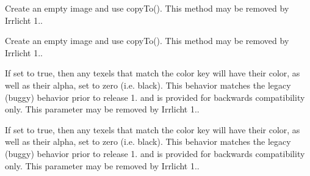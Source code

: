 \begin{DoxyRefList}
\item[\label{deprecated__deprecated000024}%
\Hypertarget{deprecated__deprecated000024}%
Member \hyperlink{classirr_1_1video_1_1IVideoDriver_aa06059abf33e473d7af77e1fbc2b0f75}{irr\+:\+:video\+:\+:I\+Video\+Driver\+:\+:create\+Image} (\hyperlink{classirr_1_1video_1_1IImage}{I\+Image} $\ast$image\+To\+Copy, const core\+::position2d$<$ s32 $>$ \&pos, const core\+::dimension2d$<$ u32 $>$ \&size)=0]Create an empty image and use copy\+To(). This method may be removed by Irrlicht 1..  
\item[\label{deprecated__deprecated000023}%
\Hypertarget{deprecated__deprecated000023}%
Member \hyperlink{classirr_1_1video_1_1IVideoDriver_af92ef735bc8c755f5c201a52a70d05e8}{irr\+:\+:video\+:\+:I\+Video\+Driver\+:\+:create\+Image} (E\+C\+O\+L\+O\+R\+\_\+\+F\+O\+R\+M\+AT format, \hyperlink{classirr_1_1video_1_1IImage}{I\+Image} $\ast$image\+To\+Copy)=0]Create an empty image and use copy\+To(). This method may be removed by Irrlicht 1..  
\item[\label{deprecated__deprecated000022}%
\Hypertarget{deprecated__deprecated000022}%
Member \hyperlink{classirr_1_1video_1_1IVideoDriver_aed772902f4fe1185b44ce81b9b0b9add}{irr\+:\+:video\+:\+:I\+Video\+Driver\+:\+:make\+Color\+Key\+Texture} (\hyperlink{classirr_1_1video_1_1ITexture}{video\+::\+I\+Texture} $\ast$texture, core\+::position2d$<$ s32 $>$ color\+Key\+Pixel\+Pos, bool zero\+Texels=false) const =0]If set to true, then any texels that match the color key will have their color, as well as their alpha, set to zero (i.\+e. black). This behavior matches the legacy (buggy) behavior prior to release 1. and is provided for backwards compatibility only. This parameter may be removed by Irrlicht 1..  
\item[\label{deprecated__deprecated000021}%
\Hypertarget{deprecated__deprecated000021}%
Member \hyperlink{classirr_1_1video_1_1IVideoDriver_a701e7d2101eb26888f57928134bc2ffb}{irr\+:\+:video\+:\+:I\+Video\+Driver\+:\+:make\+Color\+Key\+Texture} (\hyperlink{classirr_1_1video_1_1ITexture}{video\+::\+I\+Texture} $\ast$texture, \hyperlink{classirr_1_1video_1_1SColor}{video\+::\+S\+Color} color, bool zero\+Texels=false) const =0]If set to true, then any texels that match the color key will have their color, as well as their alpha, set to zero (i.\+e. black). This behavior matches the legacy (buggy) behavior prior to release 1. and is provided for backwards compatibility only. This parameter may be removed by Irrlicht 1.. 
\end{DoxyRefList}